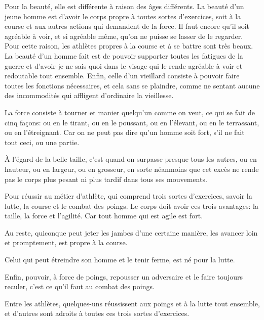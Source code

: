 Pour la beauté, elle est différente à raison des âges différents. La beauté d'un jeune homme est d'avoir le corps propre
à toutes sortes d'exercices, soit à la course et aux autres actions qui demandent de la force. Il faut encore qu'il soit
agréable à voir, et si agréable même, qu'on ne puisse se lasser de le regarder. Pour cette raison, les athlètes propres à
la course et à se battre sont très beaux. La beauté d'un homme fait est de pouvoir supporter toutes les fatigues de la guerre
et d'avoir je ne sais quoi dans le visage qui le rende agréable à voir et redoutable tout ensemble. Enfin, celle d'un
vieillard consiste à pouvoir faire toutes les fonctions nécessaires, et cela sans se plaindre, comme ne sentant aucune des
incommodités qui affligent d'ordinaire la vieillesse.

\bigbreak

La force consiste à tourner et manier quelqu'un comme on veut, ce qui se fait de cinq façons: ou en le tirant, ou en le
poussant, ou en l'élevant, ou en le terrassant, ou en l’étreignant. Car on ne peut pas dire qu'un homme soit fort, s'il
ne fait tout ceci, ou une partie.

\bigbreak

À l'égard de la belle taille, c'est quand on surpasse presque tous les autres, ou en hauteur, ou en largeur, ou en
grosseur, en sorte néanmoins que cet excès ne rende pas le corps plus pesant ni plus tardif dans tous ses mouvements.

\bigbreak

Pour réussir au métier d'athlète, qui comprend trois sortes d'exercices, savoir la lutte, la course et le combat des poings.
Le corps doit avoir ces trois avantages: la taille, la force et l'agilité. Car tout homme qui est agile est fort.

Au reste, quiconque peut jeter les jambes d'une certaine manière, les avancer loin et promptement, est propre à la course.

Celui qui peut étreindre son homme et le tenir ferme, est né pour la lutte.

Enfin, pouvoir, à force de poings, repousser un adversaire et le faire toujours reculer, c'est ce qu'il faut au combat des
poings.

Entre les athlètes, quelques-uns réussissent aux poings et à la lutte tout ensemble, et d'autres sont adroits à toutes ces
trois sortes d'exercices.

\bigbreak

